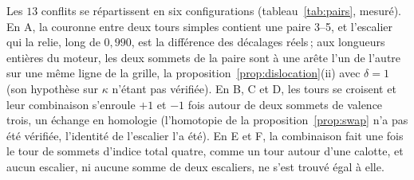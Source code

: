 \documentclass[11pt,a4paper]{article}
\begin{document}
Les $13$ conflits se répartissent en six configurations
(tableau~\ref{tab:pairs}, mesuré). En A, la couronne entre deux tours simples
contient une paire 3--5, et l'escalier qui la relie, long de $0,990$, est la
différence des décalages réels\,; aux longueurs entières du moteur, les deux
sommets de la paire sont à une arête l'un de l'autre sur une même ligne de la
grille, la proposition~\ref{prop:dislocation}(ii) avec $\delta = 1$ (son
hypothèse sur $\kappa$ n'étant pas vérifiée). En B, C et D, les tours se
croisent et leur combinaison s'enroule $+1$ et $-1$ fois autour de deux
sommets de valence trois, un échange en homologie (l'homotopie de la
proposition~\ref{prop:swap} n'a pas été vérifiée, l'identité de l'escalier
l'a été). En E et F, la combinaison fait une fois le tour de sommets d'indice
total quatre, comme un tour autour d'une calotte, et aucun escalier, ni
aucune somme de deux escaliers, ne s'est trouvé égal à elle.
\end{document}
